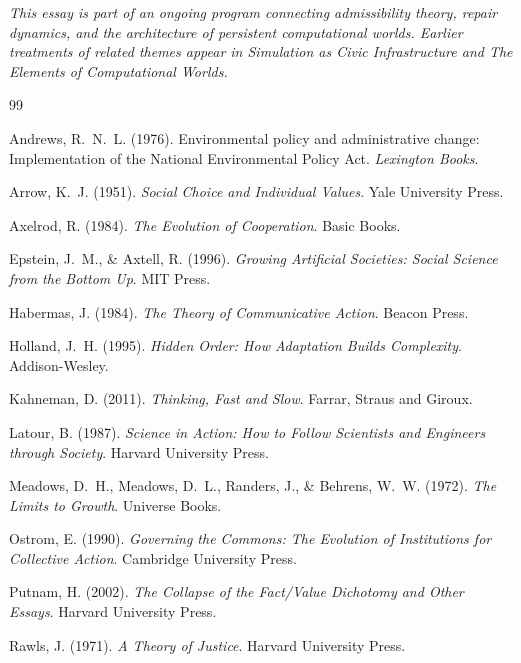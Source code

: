 \documentclass[12pt]{article}
\begin{document}
\noindent\textit{This essay is part of an ongoing program connecting admissibility theory, repair dynamics, and the architecture of persistent computational worlds. Earlier treatments of related themes appear in \emph{Simulation as Civic Infrastructure} and \emph{The Elements of Computational Worlds}.}

\begin{thebibliography}{99}

Andrews, R.~N.~L. (1976).
\newblock Environmental policy and administrative change: Implementation of the National Environmental Policy Act.
\newblock \emph{Lexington Books}.

Arrow, K.~J. (1951).
\newblock \emph{Social Choice and Individual Values}.
\newblock Yale University Press.

Axelrod, R. (1984).
\newblock \emph{The Evolution of Cooperation}.
\newblock Basic Books.

Epstein, J.~M., \& Axtell, R. (1996).
\newblock \emph{Growing Artificial Societies: Social Science from the Bottom Up}.
\newblock MIT Press.

Habermas, J. (1984).
\newblock \emph{The Theory of Communicative Action}.
\newblock Beacon Press.

Holland, J.~H. (1995).
\newblock \emph{Hidden Order: How Adaptation Builds Complexity}.
\newblock Addison-Wesley.

Kahneman, D. (2011).
\newblock \emph{Thinking, Fast and Slow}.
\newblock Farrar, Straus and Giroux.

Latour, B. (1987).
\newblock \emph{Science in Action: How to Follow Scientists and Engineers through Society}.
\newblock Harvard University Press.

Meadows, D.~H., Meadows, D.~L., Randers, J., \& Behrens, W.~W. (1972).
\newblock \emph{The Limits to Growth}.
\newblock Universe Books.

Ostrom, E. (1990).
\newblock \emph{Governing the Commons: The Evolution of Institutions for Collective Action}.
\newblock Cambridge University Press.

Putnam, H. (2002).
\newblock \emph{The Collapse of the Fact/Value Dichotomy and Other Essays}.
\newblock Harvard University Press.

Rawls, J. (1971).
\newblock \emph{A Theory of Justice}.
\newblock Harvard University Press.


\end{thebibliography}
\end{document}
